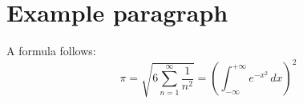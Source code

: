 \documentclass[a4paper]{article}
\begin{document}
\section{Example paragraph}
A formula follows:
\[
\pi = \sqrt{6\sum_{n=1}^{\infty}\frac{1}{n^2}}
   = \left(\int_{-\infty}^{+\infty}e^{-x^2}\,dx\right)^2
\]
\end{document}
